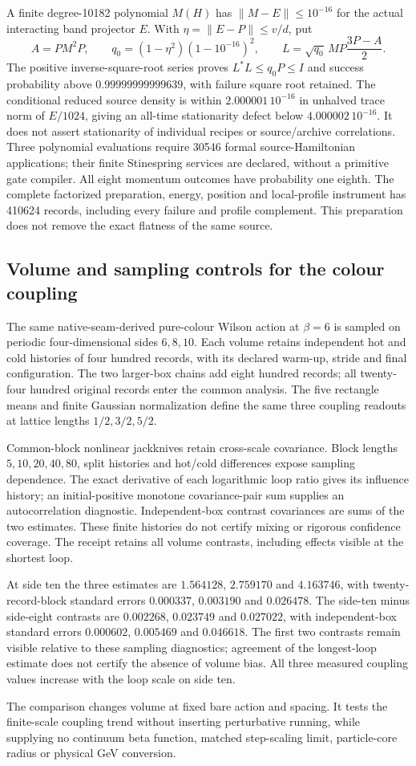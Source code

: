 A finite degree-10182 polynomial $M(H)$ has $\|M-E\|\le10^{-16}$ for
the actual interacting band projector $E$. With
$\eta=\|E-P\|\le v/d$, put
\[
 A=PM^2P,\qquad q_0=(1-\eta^2)(1-10^{-16})^2,\qquad
 L=\sqrt{q_0}\,MP\frac{3P-A}{2}.
\]
The positive inverse-square-root series proves
$L^*L\le q_0P\le I$ and success probability above
$0.99999999999639$, with failure square root retained. The conditional
reduced source density is within $2.000001\,10^{-16}$ in unhalved trace
norm of $E/1024$, giving an all-time stationarity defect below
$4.000002\,10^{-16}$. It does not assert stationarity of individual
recipes or source/archive correlations. Three polynomial evaluations
require 30546 formal source-Hamiltonian applications; their finite
Stinespring services are declared, without a primitive gate compiler.
All eight momentum outcomes have probability one eighth. The complete
factorized preparation, energy, position and local-profile instrument
has 410624 records, including every failure and profile complement.
This preparation does not remove the exact flatness of the same source.

\subsection{Volume and sampling controls for the colour coupling}

The same native-seam-derived pure-colour Wilson action at $\beta=6$
is sampled on periodic four-dimensional sides $6,8,10$. Each volume
retains independent hot and cold histories of four hundred records, with
its declared warm-up, stride and final configuration. The two larger-box
chains add eight hundred records; all twenty-four hundred original
records enter the common analysis. The five rectangle means and finite
Gaussian normalization define the same three coupling readouts at lattice
lengths $1/2,3/2,5/2$.

Common-block nonlinear jackknives retain cross-scale covariance. Block
lengths $5,10,20,40,80$, split histories and hot/cold differences expose
sampling dependence. The exact derivative of each logarithmic loop ratio
gives its influence history; an initial-positive monotone covariance-pair
sum supplies an autocorrelation diagnostic. Independent-box contrast
covariances are sums of the two estimates. These finite histories do not
certify mixing or rigorous confidence coverage. The receipt retains all
volume contrasts, including effects visible at the shortest loop.

At side ten the three estimates are $1.564128$, $2.759170$ and
$4.163746$, with twenty-record-block standard errors $0.000337$,
$0.003190$ and $0.026478$. The side-ten minus side-eight contrasts are
$0.002268$, $0.023749$ and $0.027022$, with independent-box standard
errors $0.000602$, $0.005469$ and $0.046618$. The first two contrasts
remain visible relative to these sampling diagnostics; agreement of the
longest-loop estimate does not certify the absence of volume bias. All
three measured coupling values increase with the loop scale on side ten.

The comparison changes volume at fixed bare action and spacing. It tests
the finite-scale coupling trend without inserting perturbative running,
while supplying no continuum beta function, matched step-scaling limit,
particle-core radius or physical GeV conversion.
